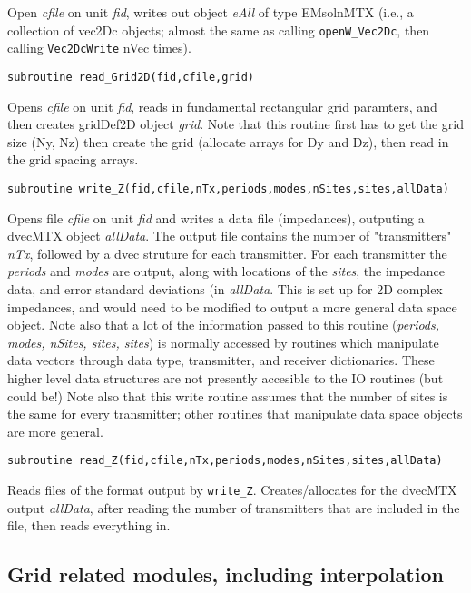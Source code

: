 \documentclass[12pt]{article}
\begin{document}
Open {\it cfile} on unit {\it fid}, writes out 
object {\it eAll} of type EMsolnMTX
(i.e., a collection of vec2Dc objects; almost the same
as calling \verb|openW_Vec2Dc|, then calling \verb|Vec2DcWrite| nVec
times).

\begin{verbatim}
subroutine read_Grid2D(fid,cfile,grid)
\end{verbatim}

Opens {\it cfile} on unit {\it fid},
reads in fundamental rectangular grid paramters,
and then creates gridDef2D object {\it grid}.  Note that
this routine first has to get the grid size (Ny, Nz)
then create the grid (allocate arrays for Dy and Dz),
then read in the grid spacing arrays.

\begin{verbatim}
subroutine write_Z(fid,cfile,nTx,periods,modes,nSites,sites,allData)
\end{verbatim}

Opens file {\it cfile} on unit {\it fid} and
writes a data file (impedances), outputing a
dvecMTX object {\it allData}.  The output file contains the number of
"transmitters" {\it nTx}, followed by a dvec struture for
each transmitter.  For each transmitter the {\it periods} and
{\it modes} are output, along with locations of the {\it sites},
the impedance data, and error standard deviations (in {\it allData}.
This is set up for
2D complex impedances, and would need to be modified
to output a more general data space object.
Note also that a lot of the information passed to this routine
({\it periods, modes, nSites, sites, sites}) is normally
accessed by routines which manipulate data vectors through
data type, transmitter, and receiver dictionaries.  These
higher level data structures are not presently accesible to
the IO routines (but could be!)  Note also that this write
routine assumes that the number of sites is the same for
every transmitter; other routines that manipulate data space
objects are more general.

\begin{verbatim}
subroutine read_Z(fid,cfile,nTx,periods,modes,nSites,sites,allData)
\end{verbatim}

Reads files of the format output by \verb|write_Z|.
Creates/allocates for the dvecMTX output {\it allData},
after reading the number of transmitters that are included
in the file, then reads everything in.

\subsection{Grid related modules, including interpolation}
\end{document}
